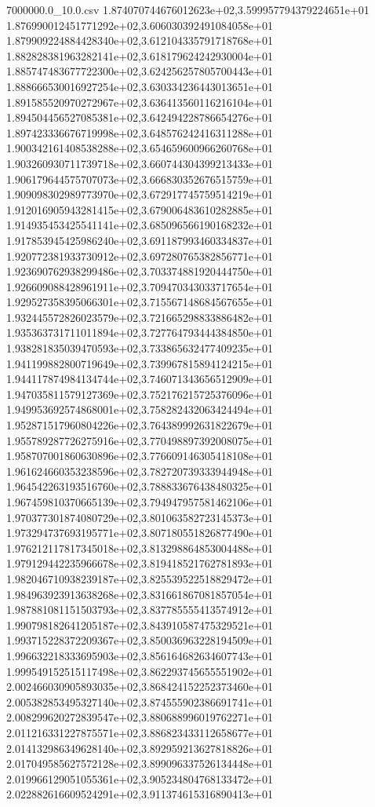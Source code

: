\begin{filecontents*}{7000000.0_10.0.csv}
1.874070744676012623e+02,3.599957794379224651e+01
1.876990012451771292e+02,3.606030392491084058e+01
1.879909224884428340e+02,3.612104335791718768e+01
1.882828381963282141e+02,3.618179624242930004e+01
1.885747483677722300e+02,3.624256257805700443e+01
1.888666530016927254e+02,3.630334236443013651e+01
1.891585520970272967e+02,3.636413560116216104e+01
1.894504456527085381e+02,3.642494228786654276e+01
1.897423336676719998e+02,3.648576242416311288e+01
1.900342161408538288e+02,3.654659600966260768e+01
1.903260930711739718e+02,3.660744304399213433e+01
1.906179644575707073e+02,3.666830352676515759e+01
1.909098302989773970e+02,3.672917745759514219e+01
1.912016905943281415e+02,3.679006483610282885e+01
1.914935453425541141e+02,3.685096566190168232e+01
1.917853945425986240e+02,3.691187993460334837e+01
1.920772381933730912e+02,3.697280765382856771e+01
1.923690762938299486e+02,3.703374881920444750e+01
1.926609088428961911e+02,3.709470343033717654e+01
1.929527358395066301e+02,3.715567148684567655e+01
1.932445572826023579e+02,3.721665298833886482e+01
1.935363731711011894e+02,3.727764793444384850e+01
1.938281835039470593e+02,3.733865632477409235e+01
1.941199882800719649e+02,3.739967815894124215e+01
1.944117874984134744e+02,3.746071343656512909e+01
1.947035811579127369e+02,3.752176215725376096e+01
1.949953692574868001e+02,3.758282432063424494e+01
1.952871517960804226e+02,3.764389992631822679e+01
1.955789287726275916e+02,3.770498897392008075e+01
1.958707001860630896e+02,3.776609146305418108e+01
1.961624660353238596e+02,3.782720739333944948e+01
1.964542263193516760e+02,3.788833676438480325e+01
1.967459810370665139e+02,3.794947957581462106e+01
1.970377301874080729e+02,3.801063582723145373e+01
1.973294737693195771e+02,3.807180551826877490e+01
1.976212117817345018e+02,3.813298864853004488e+01
1.979129442235966678e+02,3.819418521762781893e+01
1.982046710938239187e+02,3.825539522518829472e+01
1.984963923913638268e+02,3.831661867081857054e+01
1.987881081151503793e+02,3.837785555413574912e+01
1.990798182641205187e+02,3.843910587475329521e+01
1.993715228372209367e+02,3.850036963228194509e+01
1.996632218333695903e+02,3.856164682634607743e+01
1.999549152515117498e+02,3.862293745655551902e+01
2.002466030905893035e+02,3.868424152252373460e+01
2.005382853495327140e+02,3.874555902386691741e+01
2.008299620272839547e+02,3.880688996019762271e+01
2.011216331227875571e+02,3.886823433112658677e+01
2.014132986349628140e+02,3.892959213627818826e+01
2.017049585627572128e+02,3.899096337526134448e+01
2.019966129051055361e+02,3.905234804768133472e+01
2.022882616609524291e+02,3.911374615316890413e+01

\end{filecontents*}
